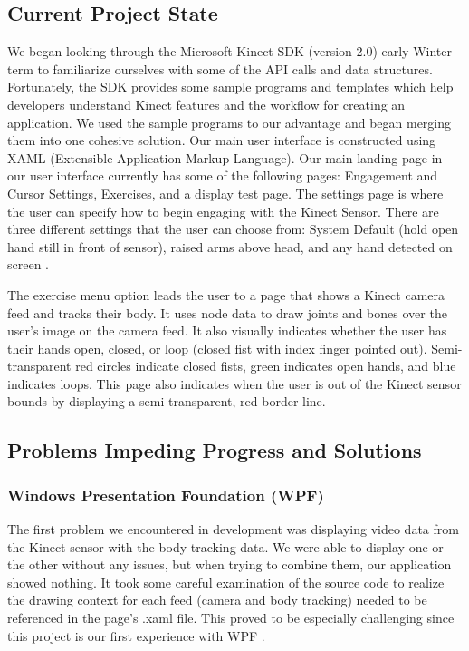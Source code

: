\documentclass[onecolumn, draftclsnofoot,10pt, compsoc]{IEEEtran}
\begin{document}
\subsection{Current Project State}
We began looking through the Microsoft Kinect SDK (version 2.0) early Winter term to familiarize ourselves with some of the API calls and data structures. Fortunately, the SDK provides some sample programs and templates which help developers understand Kinect features and the workflow for creating an application. We used the sample programs to our advantage and began merging them into one cohesive solution. Our main user interface is constructed using XAML (Extensible Application Markup Language). Our main landing page in our user interface currently has some of the following pages: Engagement and Cursor Settings, Exercises, and a display test page. The settings page is where the user can specify how to begin engaging with the Kinect Sensor. There are three different settings that the user can choose from: System Default (hold open hand still in front of sensor), raised arms above head, and any hand detected on screen \cite{KinectDevelop}.

The exercise menu option leads the user to a page that shows a Kinect camera feed and tracks their body. It uses node data to draw joints and bones over the user's image on the camera feed. It also visually indicates whether the user has their hands open, closed, or  loop (closed fist with index finger pointed out). Semi-transparent red circles indicate closed fists, green indicates open hands, and blue indicates loops. This page also indicates when the user is out of the Kinect sensor bounds by displaying a semi-transparent, red border line. 

\subsection{Problems Impeding Progress and Solutions}
\subsubsection{Windows Presentation Foundation (WPF)}
The first problem we encountered in development was displaying video data from the Kinect sensor with the body tracking data. We were able to display one or the other without any issues, but when trying to combine them, our application showed nothing. It took some careful examination of the source code to realize the drawing context for each feed (camera and body tracking) needed to be referenced in the page's .xaml file. This proved to be especially challenging since this project is our first experience with WPF \cite{KinectDevelop}.
\end{document}
